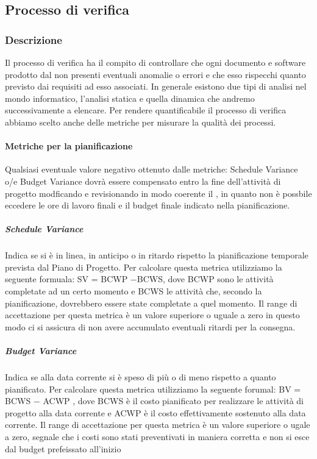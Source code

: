 			
\subsection{Processo di verifica}
\subsubsection{Descrizione}
Il processo di verifica ha il compito di controllare che ogni documento e software prodotto dal  non presenti eventuali anomalie o errori e che esso rispecchi quanto previsto dai requisiti ad esso associati. In generale esistono due tipi di analisi nel mondo informatico, l'analisi statica e quella dinamica che andremo successivamente a elencare. Per rendere quantificabile il processo di verifica abbiamo scelto anche delle metriche per misurare la qualità dei processi.

\paragraph{Metriche per la pianificazione}
Qualsiasi eventuale valore negativo ottenuto dalle  metriche: Schedule Variance o/e Budget Variance dovrà essere  compensato entro la fine dell'attività di progetto modficando e revisionando in modo coerente il \PdP, in quanto non è possbile eccedere le ore di lavoro finali e il budget finale indicato nella pianificazione.
						
\subparagraph{Schedule Variance}
Indica se si è in linea, in anticipo o in ritardo rispetto la pianificazione temporale prevista dal Piano di Progetto.
Per calcolare questa metrica utilizziamo la seguente formuala: SV = BCWP −BCWS, dove BCWP sono le attività completate ad un certo momento e BCWS
le attività che, secondo la pianificazione, dovrebbero essere state completate a quel momento.
Il range di accettazione per questa metrica è un valore superiore o uguale a zero in questo modo ci si assicura di non avere accumulato eventuali ritardi per la consegna.

\subparagraph{Budget Variance}
Indica se alla data corrente si è speso di più o di meno rispetto a quanto pianificato.
Per calcolare questa metrica utilizziamo la seguente forumal: BV = BCWS − ACWP , dove BCWS è il costo pianificato per realizzare le attività di progetto
alla data corrente e ACWP è il costo effettivamente sostenuto alla data corrente.
Il range di accettazione per questa metrica è un valore superiore o ugale a zero, segnale che i costi sono stati preventivati in maniera corretta e non si esce dal budget prefeissato all'inizio


